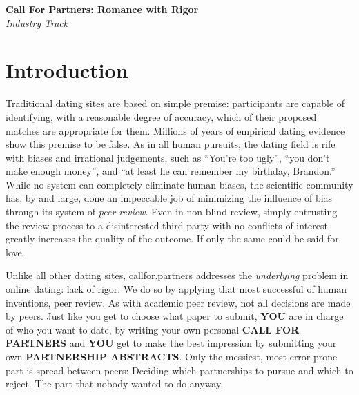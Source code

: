 \documentclass{article}
\begin{document}
\textbf{Call For Partners: Romance with Rigor}\\
\textit{Industry Track}
\author{Brandon Bohrer}
\abstract{}

\section{Introduction}
Traditional dating sites are based on simple premise: participants are capable of identifying, with a reasonable degree of accuracy, which of their proposed matches are appropriate for them.
Millions of years of empirical dating evidence show this premise to be false.
As in all human pursuits, the dating field is rife with biases and irrational judgements, such as ``You're too ugly'', ``you don't make enough money'', and ``at least he can remember my birthday, Brandon.''
While no system can completely eliminate human biases, the scientific community has, by and large, done an impeccable job of minimizing the influence of bias through its system of \emph{peer review}. Even in non-blind review, simply entrusting the review process to a disinterested third party with no conflicts of interest greatly increases the quality of the outcome. If only the same could be said for love.

Unlike all other dating sites, \url{callfor.partners} addresses the \emph{underlying} problem in online dating: lack of rigor.
We do so by applying that most successful of human inventions, peer review.
As with academic peer review, not all decisions are made by peers.
Just like you get to choose what paper to submit, \textbf{YOU} are in charge of who you want to date, by writing your own personal \textbf{CALL FOR PARTNERS} and \textbf{YOU} get to make the best impression by submitting your own \textbf{PARTNERSHIP ABSTRACTS}.
Only the messiest, most error-prone part is spread between peers: Deciding which partnerships to pursue and which to reject.
The part that nobody wanted to do anyway.
\end{document}

